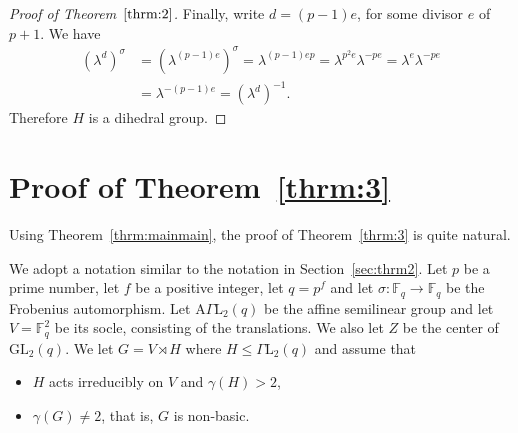 \documentclass{amsart}
\begin{document}
\begin{proof}[Proof of Theorem~$\ref{thrm:2}$]
Finally, write $d=(p-1)e$, for some divisor $e$ of $p+1$. We have
\begin{align*}
(\lambda^{d})^\sigma&=(\lambda^{(p-1)e})^\sigma=\lambda^{(p-1)ep}=\lambda^{p^2e}\lambda^{-pe}=\lambda^e\lambda^{-pe}
\\
&=\lambda^{-(p-1)e}=(\lambda^d)^{-1}.
\end{align*}
Therefore $H$ is a dihedral group.
\end{proof}

\section{Proof of Theorem~\ref{thrm:3}}
Using Theorem~\ref{thrm:mainmain}, the proof of Theorem~\ref{thrm:3} is quite natural.

We adopt a notation similar to the notation in Section~\ref{sec:thrm2}. Let $p$ be a prime number, let $f$ be a positive integer, let $q=p^f$ and let $\sigma:\mathbb{F}_q\to\mathbb{F}_q$ be the Frobenius automorphism. Let $\mathrm{A}\Gamma\mathrm{L}_2(q)$ be the affine semilinear group and 
let $V=\mathbb{F}_q^2$ be its socle, consisting of the translations. We also let $Z$ be the center of $\mathrm{GL}_2(q)$. We let $G=V\rtimes H$ where $H\le\Gamma\mathrm{L}_2(q)$ and assume that
\begin{itemize}
\item $H$ acts irreducibly on $V$ and $\gamma(H)>2$,
\item $\gamma(G)\ne 2$, that is, $G$ is non-basic.
\end{itemize}
\end{document}

